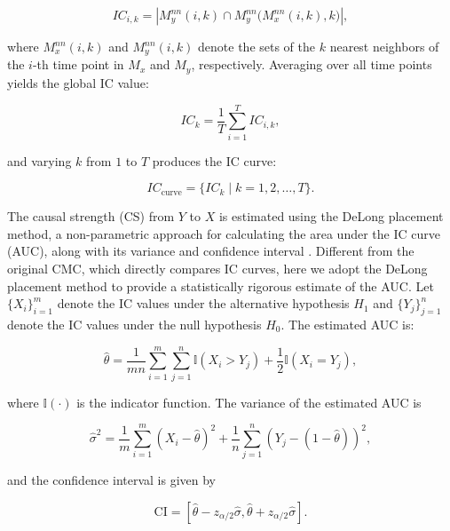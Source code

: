 \documentclass[authoryear,preprint,review,12pt]{elsarticle}
\begin{document}
\begin{equation}\label{eq_cmc_ic_ik_delong}
IC_{i,k} = \left| M_y^{nn}(i,k) \cap M_y^{nn}\big(M_x^{nn}(i,k),k\big) \right|,
\end{equation}

\noindent where $M_x^{nn}(i,k)$ and $M_y^{nn}(i,k)$ denote the sets of the $k$ nearest neighbors of the $i$-th time point in $M_x$ and $M_y$, respectively. Averaging over all time points yields the global IC value:

\begin{equation}\label{eq_cmc_ic_k_delong}
IC_k = \frac{1}{T} \sum_{i=1}^T IC_{i,k},
\end{equation}

\noindent and varying $k$ from $1$ to $T$ produces the IC curve:

\begin{equation}\label{eq_cmc_ic_curve_delong}
IC_{\text{curve}} = \{ IC_k \mid k = 1, 2, \dots, T \}.
\end{equation}

The causal strength (CS) from $Y$ to $X$ is estimated using the DeLong placement method, a non-parametric approach for calculating the area under the IC curve (AUC), along with its variance and confidence interval \citep{delong1988,sun2014delongfi}. Different from the original CMC, which directly compares IC curves, here we adopt the DeLong placement method to provide a statistically rigorous estimate of the AUC. Let $\{X_i\}_{i=1}^{m}$ denote the IC values under the alternative hypothesis $H_1$ and $\{Y_j\}_{j=1}^{n}$ denote the IC values under the null hypothesis $H_0$. The estimated AUC is:

\begin{equation}
\hat{\theta} = \frac{1}{mn} \sum_{i=1}^{m} \sum_{j=1}^{n} \mathbb{I}(X_i > Y_j) + \frac{1}{2} \mathbb{I}(X_i = Y_j),
\end{equation}

\noindent where $\mathbb{I}(\cdot)$ is the indicator function. The variance of the estimated AUC is

\begin{equation}
\hat{\sigma}^2 = \frac{1}{m} \sum_{i=1}^{m} (X_i - \hat{\theta})^2 + \frac{1}{n} \sum_{j=1}^{n} (Y_j - (1 - \hat{\theta}))^2,
\end{equation}

\noindent and the confidence interval is given by

\begin{equation}
\text{CI} = \left[ \hat{\theta} - z_{\alpha/2} \hat{\sigma}, \hat{\theta} + z_{\alpha/2} \hat{\sigma} \right].
\end{equation}
\end{document}
